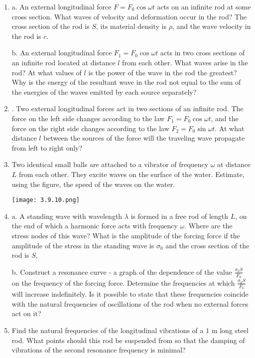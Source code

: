 \documentclass{article}
\begin{document}
\begin{enumerate}[label=3.9.\arabic*]
\item a. An external longitudinal force $F = F_0 \cos{\omega t}$ acts on an infinite rod at some cross section. What waves of velocity and deformation occur in the rod? The cross section of the rod is $S$, its material density is $\rho$, and the wave velocity in the rod is $c$. 

b. An external longitudinal force $F_1 = F_0 \cos{\omega t}$ acts in two cross sections of an infinite rod located at distance $l$ from each other. What waves arise in the rod? At what values of $l$ is the power of the wave in the rod the greatest? Why is the energy of the resultant wave in the rod not equal to the sum of the energies of the waves emitted by each source separately?

\item . Two external longitudinal forces act in two sections of an infinite rod. The force on the left side changes according to the law $F_1 = F_0 \cos{\omega t}$, and the force on the right side changes according to the law $F_2 = F_0 \sin{\omega t}$. At what distance $l$ between the sources of the force will the traveling wave propagate from left to right only?

\item Two identical small balls are attached to a vibrator of frequency $\omega$ at distance $L$ from each other. They excite waves on the surface of the water. Estimate, using the figure, the speed of the waves on the water.

\begin{center}
    \texttt{[image: 3.9.10.png]}
\end{center}

\item a. A standing wave with wavelength $\lambda$ is formed in a free rod of length $L$, on the end of which a harmonic force acts with frequency $\omega$. Where are the stress nodes of this wave? What is the amplitude of the forcing force if the amplitude of the stress in the standing wave is $\sigma_0$ and the cross section of the rod is $S$.

b. Construct a resonance curve - a graph of the dependence of the value $\frac{\sigma_0 S}{F_0}$ on the frequency of the forcing force. Determine the frequencies at which $\frac{\sigma_0 S}{F_0}$ will increase indefinitely. Is it possible to state that these frequencies coincide with the natural frequencies of oscillations of the rod when no external forces act on it?

\item Find the natural frequencies of the longitudinal vibrations of a $1$ m long steel rod. What points should this rod be suspended from so that the damping of vibrations of the second resonance frequency is minimal?


\end{enumerate}
\end{document}

